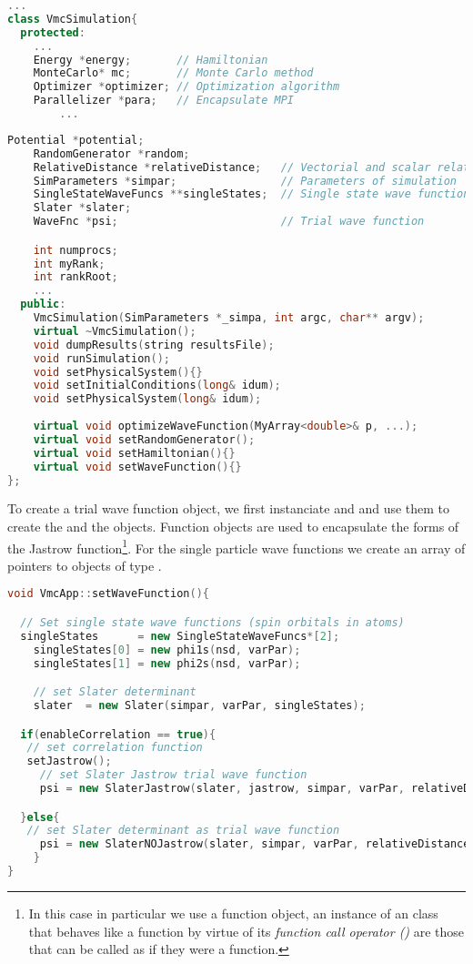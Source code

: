 \begin{lstlisting}[language=c++]
...
class VmcSimulation{
  protected:
    ...
    Energy *energy;       // Hamiltonian
    MonteCarlo* mc;       // Monte Carlo method
    Optimizer *optimizer; // Optimization algorithm
    Parallelizer *para;   // Encapsulate MPI
		...
\end{lstlisting}
\begin{lstlisting}[language=c++]
    Potential *potential; 
    RandomGenerator *random;
    RelativeDistance *relativeDistance;   // Vectorial and scalar relative distances
    SimParameters *simpar;                // Parameters of simulation
    SingleStateWaveFuncs **singleStates;  // Single state wave functions
    Slater *slater; 
    WaveFnc *psi;                         // Trial wave function

    int numprocs;
    int myRank;
    int rankRoot;
    ...
  public:
    VmcSimulation(SimParameters *_simpa, int argc, char** argv);
    virtual ~VmcSimulation();
    void dumpResults(string resultsFile);
    void runSimulation();
    void setPhysicalSystem(){}
    void setInitialConditions(long& idum);
    void setPhysicalSystem(long& idum);
    
    virtual void optimizeWaveFunction(MyArray<double>& p, ...); 
    virtual void setRandomGenerator();
    virtual void setHamiltonian(){}
    virtual void setWaveFunction(){}
};

\end{lstlisting}
\noindent
To create a trial wave function object, we first instanciate  and  and use them to create the  and the  objects. Function objects are used to encapsulate the forms of the Jastrow function\footnote{In this case in particular we use a function object, an instance of an class that behaves like a function by virtue of its \emph{function call operator ()} are those that can be called as if they were a function.}. For the single particle wave functions we create an array of pointers to objects of type . 
\begin{lstlisting}[language=c++]
void VmcApp::setWaveFunction(){

  // Set single state wave functions (spin orbitals in atoms)
  singleStates 		= new SingleStateWaveFuncs*[2]; 
	singleStates[0] = new phi1s(nsd, varPar); 
	singleStates[1] = new phi2s(nsd, varPar);

	// set Slater determinant
	slater  = new Slater(simpar, varPar, singleStates); 

  if(enableCorrelation == true){
   // set correlation function
   setJastrow();
	 // set Slater Jastrow trial wave function 
	 psi = new SlaterJastrow(slater, jastrow, simpar, varPar, relativeDistance); 

  }else{
   // set Slater determinant as trial wave function
	 psi = new SlaterNOJastrow(slater, simpar, varPar, relativeDistance);
	}
}
\end{lstlisting}

